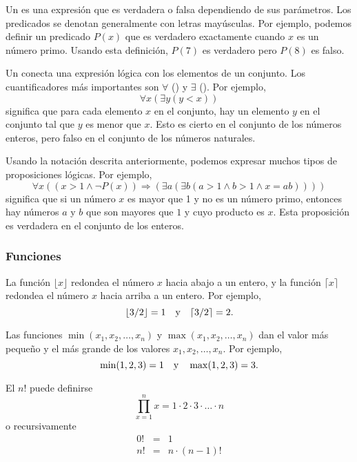 
Un  es una expresión que es verdadera o falsa
dependiendo de sus parámetros.
Los predicados se denotan generalmente con letras mayúsculas.
Por ejemplo, podemos definir un predicado $P(x)$
que es verdadero exactamente cuando $x$ es un número primo.
Usando esta definición, $P(7)$ es verdadero pero $P(8)$ es falso.


Un  conecta una expresión lógica
con los elementos de un conjunto.
Los cuantificadores más importantes son
$\forall$ () y $\exists$ ().
Por ejemplo,
\[\forall x (\exists y (y < x))\]
significa que para cada elemento $x$ en el conjunto,
hay un elemento $y$ en el conjunto
tal que $y$ es menor que $x$.
Esto es cierto en el conjunto de los números enteros,
pero falso en el conjunto de los números naturales.

Usando la notación descrita anteriormente,
podemos expresar muchos tipos de proposiciones lógicas.
Por ejemplo,
\[\forall x ((x>1 \land \lnot P(x)) \Rightarrow (\exists a (\exists b (a > 1 \land b > 1 \land x = ab))))\]
significa que si un número $x$ es mayor que 1
y no es un número primo,
entonces hay números $a$ y $b$
que son mayores que $1$ y cuyo producto es $x$.
Esta proposición es verdadera en el conjunto de los enteros.

\subsubsection{Funciones}

La función $\lfloor x \rfloor$ redondea el número $x$
hacia abajo a un entero, y la función
$\lceil x \rceil$ redondea el número $x$
hacia arriba a un entero. Por ejemplo,
\[ \lfloor 3/2 \rfloor = 1 \hspace{10px} \textrm{y} \hspace{10px} \lceil 3/2 \rceil = 2.\]

Las funciones $\min(x_1,x_2,\ldots,x_n)$
y $\max(x_1,x_2,\ldots,x_n)$
dan el valor más pequeño y el más grande de los valores
$x_1,x_2,\ldots,x_n$.
Por ejemplo,
\[ \min(1,2,3)=1 \hspace{10px} \textrm{y} \hspace{10px} \max(1,2,3)=3.\]


El  $n!$ puede definirse
\[\prod_{x=1}^n x = 1 \cdot 2 \cdot 3 \cdot \ldots \cdot n\]
o recursivamente
\[
\begin{array}{lcl}
0! & = & 1 \\
n! & = & n \cdot (n-1)! \\
\end{array}
\]

